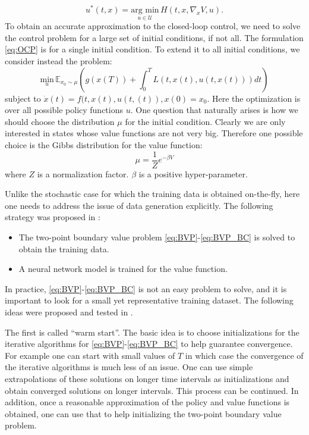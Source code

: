 \documentclass[12pt]{article}
\newcommand{\bi}{\begin{itemize}}
\newcommand{\ei}{\end{itemize}}
\theoremstyle{definition}
\newcommand{\E}{\mathbb{E}}
\newcommand{\bx}{{x}}
\newcommand{\be}{\begin{equation}}
\newcommand{\ee}{\end{equation}}
\begin{document}
\begin{equation}
\label{eq: optimal feedback control using dVdx}
u^* (t, x) = \underset{u \in \mathcal U}{\text{arg min}} \, H \left( t, x, \nabla_{\bx} V, u \right) .
\end{equation}
%
%
%
%
%
%
%
%
%
%
%
%
%
To obtain an accurate approximation to the closed-loop control, we need to solve the control problem
for a large set of initial conditions, if not all.
%
%
The formulation \eqref{eq:OCP} is for a single initial condition.  To extend it to all initial conditions,
we consider instead the problem:
\begin{equation}
\label{eq: OCP1}
\underset{u}{\text{min}} \,  \E_{\bx_0 \sim \mu} \left( g (x (T)) + \displaystyle \int_0^{T} L (t, x(t), u(t, \bx(t))) dt \right)
\end{equation}
 subject to $\dot {x} (t) = f (t, x(t), u(t, (t)), x (0) = x_0 $.
 Here the optimization is over all possible policy functions $u$.
 One question that naturally arises is how we should choose the distribution $\mu$ for the initial condition.
 Clearly we are only interested in states whose value functions are not very big. Therefore one possible choice is
 the Gibbs distribution for the value function:
 \be
 \mu = \frac 1Z e^{-\beta V}
 \ee
 where $Z$ is a normalization factor. $\beta$ is a positive hyper-parameter. 
%
%
%
%

Unlike the stochastic case for which the training data is obtained on-the-fly, here one needs to address the issue of 
data generation explicitly. 
The following strategy was proposed in \cite{nakamura2019adaptive, kang2019algorithms}:
\bi
\item The two-point boundary value problem \eqref{eq:BVP}-\eqref{eq:BVP_BC} is solved to obtain the training data.
\item A neural network model is trained for the value function.
\ei
 In practice, \eqref{eq:BVP}-\eqref{eq:BVP_BC} is not an easy problem to solve, and
 it is important to  look for a small yet representative training dataset.
 The following ideas were proposed and tested in \cite{nakamura2019adaptive, kang2019algorithms}.
 
 The first is called ``warm start''.   The basic idea is to choose initializations for the iterative algorithms for \eqref{eq:BVP}-\eqref{eq:BVP_BC} to help guarantee convergence.  For example one can start with small values of $T$ in which case the convergence
 of the iterative algorithms is much less of an issue. One can use simple extrapolations of  these solutions on longer time intervals
 as initializations and obtain converged solutions on longer intervals.  This process can be continued.
 In addition,  once a reasonable approximation of the policy and value functions is obtained, one can use that to help initializing the
 two-point boundary value problem.
 
\end{document}
